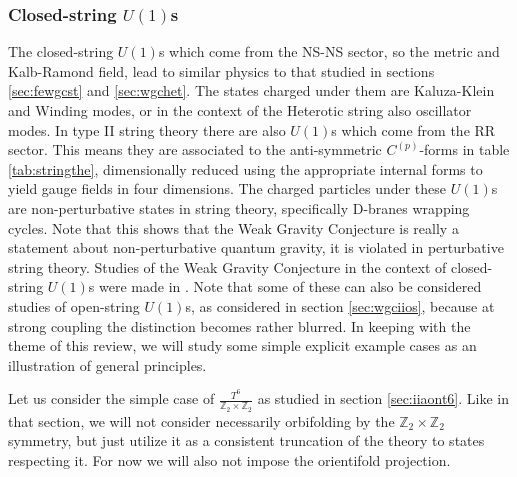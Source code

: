 \documentclass[11pt,a4paper]{article}
\numberwithin{equation}{section}
\numberwithin{table}{section}\setlength{\multlinegap}{25pt}
\begin{document}
\subsubsection{Closed-string $U(1)$s}
\label{sec:clstru1}

The closed-string $U(1)$s which come from the NS-NS sector, so the metric and Kalb-Ramond field, lead to similar physics to that studied in sections \ref{sec:fewgcst} and \ref{sec:wgchet}. The states charged under them are Kaluza-Klein and Winding modes, or in the context of the Heterotic string also oscillator modes. In type II string theory there are also $U(1)$s which come from the RR sector. This means they are associated to the anti-symmetric $C^{(p)}$-forms in table \ref{tab:stringthe}, dimensionally reduced using the appropriate internal forms to yield gauge fields in four dimensions. The charged particles under these $U(1)$s are non-perturbative states in string theory, specifically D-branes wrapping cycles. Note that this shows that the Weak Gravity Conjecture is really a statement about non-perturbative quantum gravity, it is violated in perturbative string theory. Studies of the Weak Gravity Conjecture in the context of closed-string $U(1)$s were made in \cite{Hebecker:2015zss,Heidenreich:2016jrl,Montero:2017yja,Grimm:2018ohb,Lee:2018urn,Lee:2018spm,Vittmann,Grimm:2018cpv,Lee:2019tst}. Note that some of these can also be considered studies of open-string $U(1)$s, as considered in section \ref{sec:wgciios}, because at strong coupling the distinction becomes rather blurred. In keeping with the theme of this review, we will study some simple explicit example cases as an illustration of general principles. 

Let us consider the simple case of $\frac{T^6}{\mathbb{Z}_2 \times \mathbb{Z}_2}$ as studied in section \ref{sec:iiaont6}. Like in that section, we will not consider necessarily orbifolding by the $\mathbb{Z}_2 \times \mathbb{Z}_2$ symmetry, but just utilize it as a consistent truncation of the theory to states respecting it. For now we will also not impose the orientifold projection. 
\end{document}
